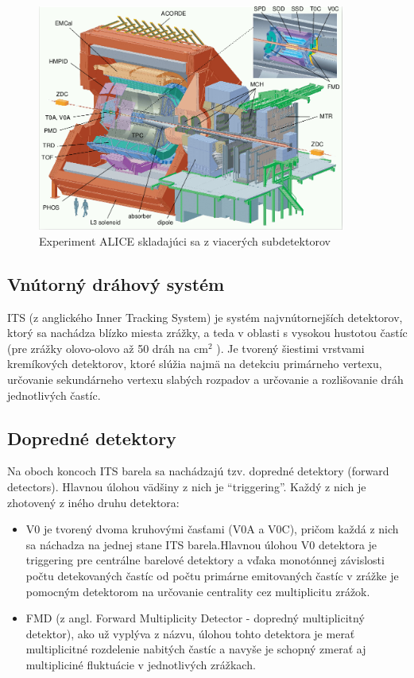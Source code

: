 \documentclass[thesismargins, thesislinespacing]{rnthesis}
\begin{document}
\begin{figure}[hbtp!]
	\begin{center}
		\includegraphics[width=0.9\textwidth]{./Obrazky_praca/ALICE.png}
		\caption{Experiment ALICE skladajúci sa z viacerých subdetektorov~\cite{aliceDetektor}}
		\label{ALICE}
	\end{center}
\end{figure}

\subsection{Vnútorný dráhový systém}

ITS (z anglického Inner Tracking System) je systém najvnútornejších detektorov, ktorý sa nachádza blízko miesta zrážky, a teda v oblasti s vysokou hustotou častíc (pre zrážky olovo-olovo až 50 dráh na $\mathrm{cm}^2$ ). Je tvorený šiestimi vrstvami kremíkových detektorov, ktoré slúžia najmä na detekciu primárneho vertexu, určovanie sekundárneho vertexu slabých rozpadov a určovanie a rozlišovanie dráh jednotlivých častíc. 

\subsection{Dopredné detektory}

Na oboch koncoch ITS barela sa nachádzajú tzv. dopredné detektory (forward detectors). Hlavnou úlohou vädšiny z nich je “triggering”. Každý z nich je zhotovený z iného druhu detektora:

\begin{itemize}

	\item V0 je tvorený dvoma kruhovými časťami (V0A a V0C), pričom každá z nich sa náchadza na jednej stane ITS barela.Hlavnou úlohou V0 detektora je triggering pre centrálne barelové detektory a vďaka monotónnej závislosti počtu detekovaných častíc od počtu primárne emitovaných častíc v zrážke je pomocným detektorom na určovanie centrality cez multiplicitu zrážok.  
	\item FMD (z angl. Forward Multiplicity Detector - dopredný multiplicitný detektor), ako už vyplýva z názvu, úlohou tohto detektora je merať multiplicitné rozdelenie nabitých častíc a navyše je schopný zmerať aj multipliciné fluktuácie v jednotlivých zrážkach.  
\end{itemize}
\end{document}
